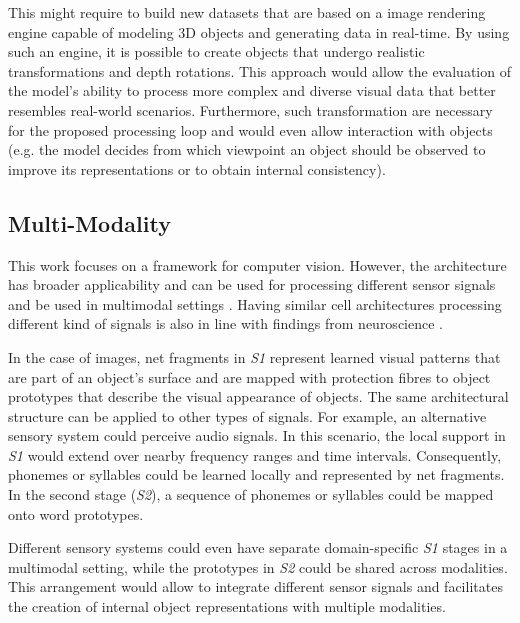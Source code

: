 This might require to build new datasets that are based on a image rendering engine capable of modeling 3D objects and generating data in real-time.
By using such an engine, it is possible to create objects that undergo realistic transformations and depth rotations. This approach would allow the evaluation of the model's ability to process more complex and diverse visual data that better resembles real-world scenarios.
Furthermore, such transformation are necessary for the proposed processing loop and would even allow interaction with objects (e.g. the model decides from which viewpoint an object should be observed to improve its representations or to obtain internal consistency).



\subsection{Multi-Modality}
This work focuses on a framework for computer vision. However, the architecture has broader applicability and can be used for processing different sensor signals and be used in multimodal settings \cite{ngiam_multimodal_2011, liu_learn_2018, baltrusaitis_multimodal_2019}.
Having similar cell architectures processing different kind of signals is also in line with findings from neuroscience .

In the case of images, net fragments in \emph{S1} represent learned visual patterns that are part of an object's surface and are mapped with protection fibres to object prototypes that describe the visual appearance of objects. 
The same architectural structure can be applied to other types of signals. For example, an alternative sensory system could perceive audio signals. In this scenario, the local support in \emph{S1} would extend over nearby frequency ranges and time intervals. Consequently, phonemes or syllables could be learned locally and represented by net fragments. In the second stage (\emph{S2}), a sequence of phonemes or syllables could be mapped onto word prototypes.

Different sensory systems could even have separate domain-specific \emph{S1} stages in a multimodal setting, while the prototypes in \emph{S2} could be shared across modalities. This arrangement would allow to integrate different sensor signals and facilitates the creation of internal object representations with multiple modalities.